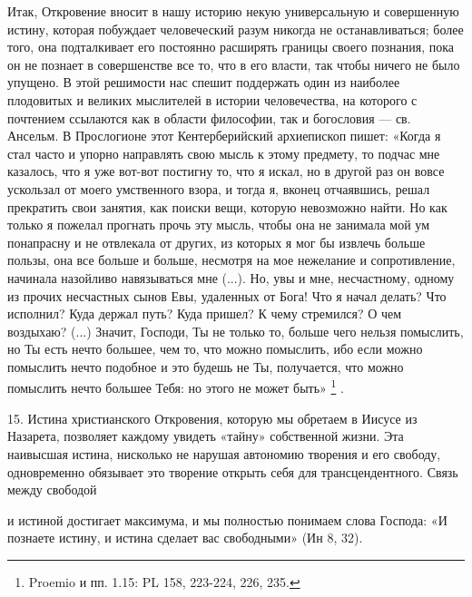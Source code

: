 \documentclass[a5paper,10pt]{article}
\begin{document}
Итак, Откровение вносит в нашу историю некую универсальную и совершенную
истину, которая побуждает человеческий разум никогда не останавливаться; более
того, она подталкивает его постоянно расширять границы своего познания, пока он
не познает в совершенстве все то, что в его власти, так чтобы ничего не было
упущено. В этой решимости нас спешит поддержать один из наиболее плодовитых и
великих мыслителей в истории человечества, на которого с почтением ссылаются
как в области философии, так и богословия — св. Ансельм. В Прослогионе этот
Кентерберийский архиепископ пишет: «Когда я стал часто и упорно направлять свою
мысль к этому предмету, то подчас мне казалось, что я уже вот-вот постигну то,
что я искал, но в другой раз он вовсе ускользал от моего умственного взора, и
тогда я, вконец отчаявшись, решал прекратить свои занятия, как поиски вещи,
которую невозможно найти. Но как только я пожелал прогнать прочь эту мысль,
чтобы она не занимала мой ум понапрасну и не отвлекала от других, из которых я
мог бы извлечь больше пользы, она все больше и больше, несмотря на мое
нежелание и сопротивление, начинала назойливо навязываться мне (...). Но, увы и
мне, несчастному, одному из прочих несчастных сынов Евы, удаленных от Бога! Что
я начал делать? Что исполнил? Куда держал путь? Куда пришел? К чему стремился?
О чем воздыхаю? (...) Значит, Господи, Ты не только то, больше чего нельзя
помыслить, но Ты есть нечто большее, чем то, что можно помыслить, ибо если
можно помыслить нечто подобное и это будешь не Ты, получается, что можно
помыслить нечто большее Тебя: но этого не может быть» \footnote{Proemio и пп.
1.15: PL 158, 223-224, 226, 235.} .

15. Истина христианского Откровения, которую мы обретаем в Иисусе из Назарета,
позволяет каждому увидеть «тайну» собственной жизни. Эта наивысшая истина,
нисколько не нарушая автономию творения и его свободу, одновременно обязывает
это творение открыть себя для трансцендентного. Связь между свободой

и истиной достигает максимума, и мы полностью понимаем слова Господа: «И
познаете истину, и истина сделает вас свободными» (Ин 8, 32).
\end{document}
